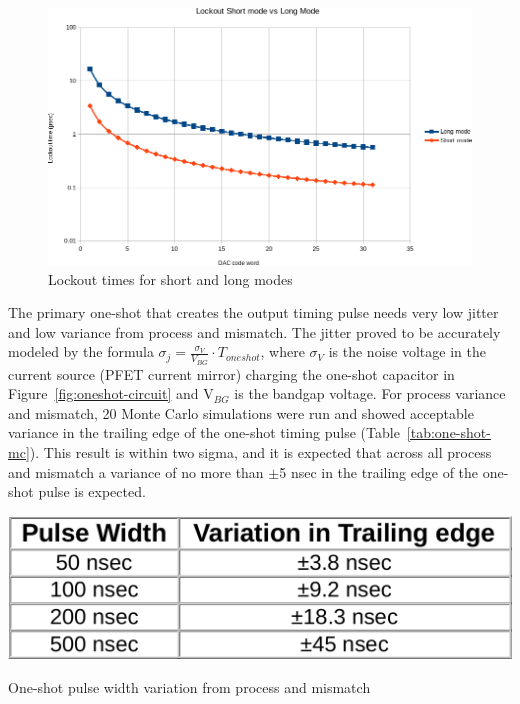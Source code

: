\documentclass[12pt,oneside,final]{siuethesis}
\theoremstyle{definition}
\begin{document}
\begin{figure}[htbp!]
 \centering
 \includegraphics[scale=.63,keepaspectratio=true]{./ch4_figures/lockout_plot.png}
 \caption{Lockout times for short and long modes}
 \label{fig:lockout-spread}
\end{figure}

\par The primary one-shot that creates the output timing pulse needs very low jitter and low variance from process and mismatch. The jitter proved to be accurately modeled by the formula $\sigma_{j} = \frac{\sigma_{V}}{V_{BG}}\cdot T_{oneshot}$, where $\sigma_{V}$ is the noise voltage in the current source (PFET current mirror) charging the one-shot capacitor in Figure~\ref{fig:oneshot-circuit} and V$_{BG}$ is the bandgap voltage. For process variance and mismatch, 20 Monte Carlo simulations were run and showed acceptable variance in the trailing edge of the one-shot timing pulse (Table~\ref{tab:one-shot-mc}). This result is within two sigma, and it is expected that across all process and mismatch a variance of no more than $\pm$5 nsec in the trailing edge of the one-shot pulse is expected.

\begin{table}[htbp!]
 \centering
 \includegraphics[scale=.25,keepaspectratio=true]{../data/oneshot_mc.png}
 \caption{One-shot pulse width variation from process and mismatch}
 \label{tab:one-shot-mc}
\end{table}
\end{document}
